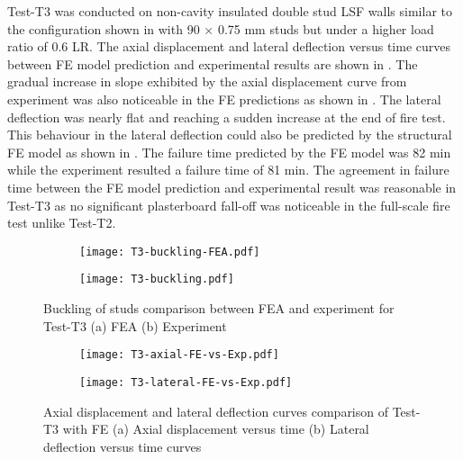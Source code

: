 Test-T3 was conducted on non-cavity insulated double stud LSF walls similar to the configuration shown in  with 90 $\times$ 0.75 mm studs but under a higher load ratio of 0.6 LR. The axial displacement and lateral deflection versus time curves between FE model prediction and experimental results are shown in . The gradual increase in slope exhibited by the axial displacement curve from experiment was also noticeable in the FE predictions as shown in . The lateral deflection was nearly flat and reaching a sudden increase at the end of fire test. This behaviour in the lateral deflection could also be predicted by the structural FE model as shown in . The failure time predicted by the FE model was 82 min while the experiment resulted a failure time of 81 min. The agreement in failure time between the FE model prediction and experimental result was reasonable in Test-T3 as no significant plasterboard fall-off was noticeable in the full-scale fire test unlike Test-T2.
\begin{figure}[!htbp]
	\centering
	\begin{subfigure}[b]{0.8\textwidth}
		\centering
		\texttt{[image: T3-buckling-FEA.pdf]}
		\caption{}
		\label{subfig:T3-buckling-FEA}
	\end{subfigure}
	\begin{subfigure}[b]{0.3\textwidth}
		\centering
		\texttt{[image: T3-buckling.pdf]}
		\caption{}
		\label{subfig:T3-buckling-FEA-Exp}
	\end{subfigure}
	   \caption{Buckling of studs comparison between FEA and experiment for Test-T3 (a) FEA (b) Experiment}
	   \label{fig:T3-buckling-FE-vs-Exp}
\end{figure} 
\begin{figure}[!htbp]
	\centering
	\begin{subfigure}[b]{0.45\textwidth}
		\centering
		\texttt{[image: T3-axial-FE-vs-Exp.pdf]}
		\caption{}
		\label{subfig:T3-axial-FE-vs-Exp}
	\end{subfigure}
	\begin{subfigure}[b]{0.45\textwidth}
		\centering
		\texttt{[image: T3-lateral-FE-vs-Exp.pdf]}
		\caption{}
		\label{subfig:T3-lateral-FE-vs-Exp}
	\end{subfigure}
	   \caption{Axial displacement and lateral deflection curves comparison of Test-T3 with FE (a) Axial displacement versus time (b) Lateral deflection versus time curves}
	   \label{fig:T3-structural-FE-vs-Exp}
\end{figure} 


